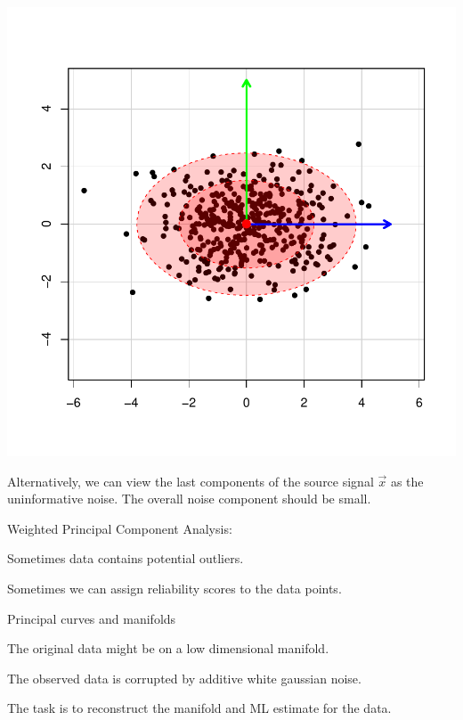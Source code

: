 \documentclass[landscape,footrule]{foils}
\newcommand{\lastline}{\vspace*{-2ex}}
\begin{document}
\begin{center}
\includegraphics[scale=0.45]{rotated-distribution-ii.pdf}
\end{center}\vspace*{-1cm}

Alternatively, we can view the last components of the source signal $\vec{x}$ as the uninformative noise. The overall noise component should be small.\lastline


Weighted Principal Component Analysis:
\begin{triangles}
\item Sometimes data contains potential outliers.
\item Sometimes we can assign reliability scores to the data points. 
\end{triangles}\vspace*{1.0cm}

Principal curves and manifolds
\begin{triangles}
\item The original data might be on a low dimensional manifold. 
\item The observed data is corrupted by additive white gaussian noise. 
\item The task is to reconstruct the manifold and ML estimate for the data. 
\end{triangles}\vspace*{1.0cm}
\end{document}
